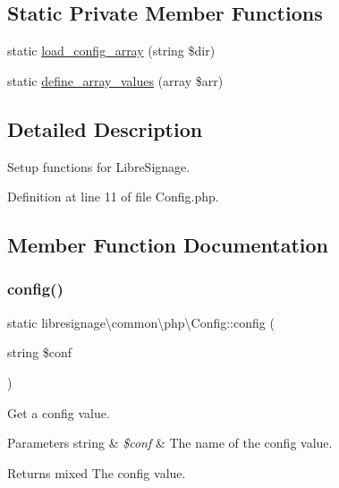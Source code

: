 \subsection*{Static Private Member Functions}
\begin{DoxyCompactItemize}
\item 
static \hyperlink{classlibresignage_1_1common_1_1php_1_1Config_aeb976d56d589cd3671c91bb84a67f50f}{load\+\_\+config\+\_\+array} (string \$dir)
\item 
static \hyperlink{classlibresignage_1_1common_1_1php_1_1Config_a59dd862580ea918d03444c232cd61c04}{define\+\_\+array\+\_\+values} (array \$arr)
\end{DoxyCompactItemize}


\subsection{Detailed Description}
Setup functions for Libre\+Signage. 

Definition at line 11 of file Config.\+php.



\subsection{Member Function Documentation}
\mbox{\label{classlibresignage_1_1common_1_1php_1_1Config_a435561f8ed294df80fab013aa869882d}} 
\subsubsection{\texorpdfstring{config()}{config()}}
{\footnotesize\ttfamily static libresignage\textbackslash{}common\textbackslash{}php\textbackslash{}\+Config\+::config (\begin{DoxyParamCaption}\item[{string}]{\$conf }\end{DoxyParamCaption})\hspace{0.3cm}{\ttfamily [static]}}

Get a config value.


\begin{DoxyParams}[1]{Parameters}
string & {\em \$conf} & The name of the config value.\\
\hline
\end{DoxyParams}
\begin{DoxyReturn}{Returns}
mixed The config value. 
\end{DoxyReturn}


